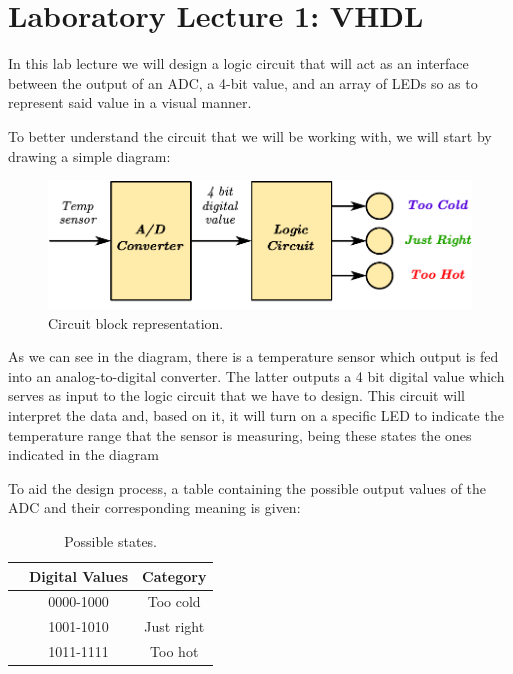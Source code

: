 \section{Laboratory Lecture 1: VHDL}

In this lab lecture we will design a logic circuit that will act as an interface between the output of an ADC, a 4-bit value, and an array of LEDs so as to represent said value in a visual manner.\medskip

To better understand the circuit that we will be working with, we will start by drawing a simple diagram:\medskip

\begin{figure}[H]
    \centering
    \includegraphics[width=\linewidth]{Graphics/VHDL/Practice 1/Temp_ADC_Logic.pdf}
    \caption{Circuit block representation.}
    \label{fig:tempcircuit}
\end{figure}

As we can see in the diagram, there is a temperature sensor which output is fed into an analog-to-digital converter. The latter outputs a 4 bit digital value which serves as input to the logic circuit that we have to design. This circuit will interpret the  data and, based on it, it will turn on a specific LED to indicate the temperature range that the sensor is measuring, being these states the ones indicated in the diagram\medskip

To aid the design process, a table containing the possible output values of the ADC and their corresponding meaning is given:

\begin{table}[ht]
    \centering
        \begin{tabular}[t]{lcc}
            \toprule
            &\textbf{Digital Values}&\textbf{Category}\\
            \midrule
            &0000-1000&Too cold\\
            &1001-1010&Just right\\
            &1011-1111&Too hot\\
            \bottomrule
        \end{tabular}
        \caption{Possible states.}
\end{table}

